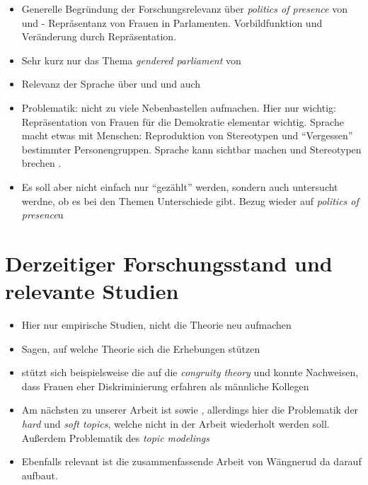 \documentclass[12pt, 
    twoside=false, 
    bibliography=totoc, 
    numbers=endperiod, 
    headings=normal, 
    toc=chapterentrydotfill
    ]{scrbook}
\begin{document}
\begin{itemize}
    \item Generelle Begründung der Forschungsrelevanz über \emph{politics of presence} von \textcite{phillips_1998} und \textcite{pitkin_1972} - Repräsentanz von Frauen in Parlamenten. Vorbildfunktion und Veränderung durch Repräsentation.
    \item Sehr kurz nur das Thema \emph{gendered parliament} von \textcite{shelley_2011}
    \item Relevanz der Sprache über \textcite*{stahlberg_2001} und \textcite{stahlberg_2007} und auch \textcite{menegatti_2017}
    \item Problematik: nicht zu viele 
Nebenbastellen aufmachen. Hier nur wichtig: Repräsentation von Frauen für die Demokratie elementar wichtig. Sprache macht etwas mit Menschen: Reproduktion von Stereotypen und \enquote{Vergessen} bestimmter Personengruppen. Sprache kann sichtbar machen und Stereotypen brechen \parencite{sczesny_2016}.
    \item Es soll aber nicht einfach nur \enquote{gezählt} werden, sondern auch untersucht werdne, ob es bei den Themen Unterschiede gibt. Bezug wieder auf \emph{politics of presence}u\end{itemize}

\section{Derzeitiger Forschungsstand und relevante Studien}
\begin{itemize}
    \item Hier nur empirische Studien, nicht die Theorie neu aufmachen
    \item Sagen, auf welche Theorie sich die Erhebungen stützen
    \item \textcite{eagly_2002} stützt sich beispielsweise die auf die \emph{congruity theory} und konnte Nachweisen, dass Frauen eher Diskriminierung erfahren als männliche Kollegen
    \item Am nächsten zu unserer Arbeit ist \textcite{back_2014} sowie \textcite{back_2018}, allerdings hier die Problematik der \emph{hard} und \emph{soft topics}, welche nicht in der Arbeit wiederholt werden soll. Außerdem Problematik des \emph{topic modelings}
    \item Ebenfalls relevant ist die zusammenfassende Arbeit von Wängnerud \parencites*{wangnerud_2000}{wangnerud_2009} da \textcite{back_2014} darauf aufbaut.
\end{itemize}
\end{document}
